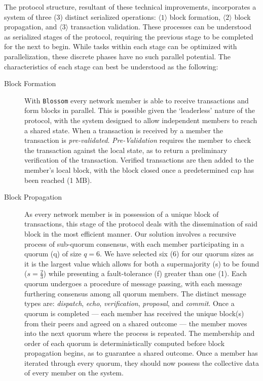 The protocol structure, resultant of these technical improvements, incorporates a  system of three (3) distinct serialized operations: \(\langle 1 \rangle\) block formation, \(\langle 2 \rangle\) block propagation, and \(\langle 3 \rangle\) transaction validation. These processes can be understood as serialized stages of the protocol, requiring the previous stage to be completed for the next to begin. While tasks within each stage can be optimized with parallelization, these discrete phases have no such parallel potential. The characteristics of each stage can best be understood as the following:

\begin{description}
\item[Block Formation] With \texttt{Blossom} every network member is able to receive transactions and form blocks in parallel. This is possible given the ‘leaderless’ nature of the protocol, with the system designed to allow independent members to reach a shared state. When a transaction is received by a member the transaction is \textit{pre-validated}. \textit{Pre-Validation} requires the member to check the transaction against the local state, as to return a preliminary verification of the transaction. Verified transactions are then added to the member's local block, with the block closed once a predetermined cap has been reached (1 MB).

\item[Block Propagation] As every network member is in possession of a unique block of transactions, this stage of the protocol deals with the dissemination of said block in the most efficient manner. Our solution involves a recursive process of sub-quorum consensus, with each member participating in a quorum (q) of size \(q = 6\). We have selected six (6) for our quorum sizes as it is the largest value which allows for both a supermajority (s) to be found (\(s=\frac{2}{3}\)) while presenting a fault-tolerance (f) greater than one (1). Each quorum undergoes a procedure of message passing, with each message furthering consensus among all quorum members. The distinct message types are: \textit{dispatch}, \textit{echo}, \textit{verification}, \textit{proposal}, and \textit{commit}. Once a quorum is completed — each member has received the unique block(s) from their peers and agreed on a shared outcome — the member moves into the next quorum where the process is repeated. The membership and order of each quorum is deterministically computed before block propagation begins, as to guarantee a shared outcome. Once a member has iterated through every quorum, they should now possess the collective data of every member on the system.


\end{description}
